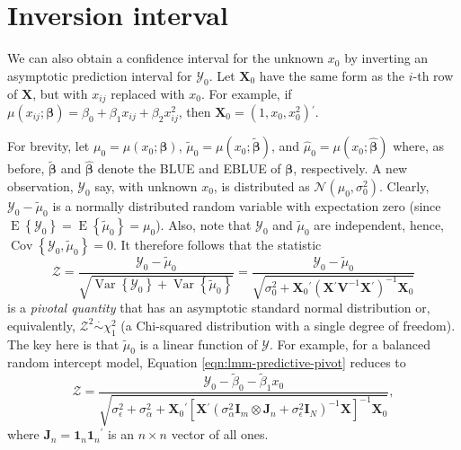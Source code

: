 \documentclass[cmfont,usenames,dvipsnames,leqno]{afit-etd}\usepackage[]{graphicx}\usepackage[]{color}
\newcommand{\trans}{\ensuremath{^\prime}}
\newcommand{\bc}[1]{\ensuremath{\bm{\mathcal{#1}}}}
\newcommand{\mc}[1]{\ensuremath{\mathcal{#1}}}
\newcommand{\wh}[1]{\ensuremath{\widehat{#1}}}
\newcommand{\E}{\operatorname{E}}
\newcommand{\var}{\operatorname{Var}}
\newcommand{\cov}{\operatorname{Cov}}
\newcommand{\X}{\ensuremath{\bm{X}}}
\begin{document}
\section{Inversion interval}
\label{sec:calibration-lmm-inversion}
We can also obtain a confidence interval for the unknown $x_0$ by inverting an asymptotic prediction interval for $\mc{Y}_0$. Let $\X_0$ have the same form as the $i$-th row of $\X$, but with $x_{ij}$ replaced with $x_0$. For example, if $\mu\left(x_{ij}; \bm{\beta}\right) = \beta_0 + \beta_1 x_{ij} + \beta_2 x_{ij}^2$, then $\X_0 = \left(1, x_0, x_0^2\right)\trans$. 

For brevity, let $\mu_0 = \mu\left(x_0; \bm{\beta}\right)$, $\widetilde{\mu}_0 = \mu\left(x_0; \widetilde{\bm{\beta}}\right)$, and $\wh{\mu}_0 = \mu\left(x_0; \wh{\bm{\beta}}\right)$ where, as before, $\widetilde{\bm{\beta}}$ and $\wh{\bm{\beta}}$ denote the BLUE and EBLUE of $\bm{\beta}$, respectively. A new observation, $\mc{Y}_0$ say, with unknown $x_0$, is distributed as $\mc{N}\left(\mu_0, \sigma_0^2\right)$. Clearly, $\mc{Y}_0 - \widetilde{\mu}_0$ is a normally distributed random variable with expectation zero (since $\E\left\{\mc{Y}_0\right\} = \E\left\{\widetilde{\mu}_0\right\} = \mu_0$). Also, note that $\mc{Y}_0$ and $\widetilde{\mu}_0$ are independent, hence, $\cov\left\{\mc{Y}_0, \widetilde{\mu}_0\right\} = 0$. It therefore follows that the statistic 
\begin{equation}
\label{eqn:lmm-predictive-pivot}
  \mc{Z} = \frac{\mc{Y}_0 - \widetilde{\mu}_0}{\sqrt{\var\left\{\mc{Y}_0\right\} + \var\left\{\widetilde{\mu}_0\right\}}} = \frac{\mc{Y}_0 - \widetilde{\mu}_0}{\sqrt{\sigma_0^2 + \X_0\trans\left(\X\trans\bm{V}^{-1}\X\trans\right)^{-1}\X_0}}
\end{equation}
is a \textit{pivotal quantity} that has an asymptotic standard normal distribution or, equivalently, $\mc{Z}^2 \stackrel{\cdot}{\sim} \chi_1^2$ (a Chi-squared distribution with a single degree of freedom). The key here is that $\widetilde{\mu}_0$ is a linear function of $\bc{Y}$. For example, for a balanced random intercept model, Equation \eqref{eqn:lmm-predictive-pivot} reduces to
\begin{equation*}
  \mc{Z} = \frac{\mc{Y}_0 - \widetilde{\beta}_0 - \widetilde{\beta}_1 x_0}{\sqrt{\sigma_\epsilon^2 + \sigma_\alpha^2 + \X_0\trans\left[\X\trans\left( \sigma_\alpha^2\bm{I}_m \otimes \bm{J}_n + \sigma_\epsilon^2\bm{I}_N \right)^{-1}\X\right]^{-1}\X_0}},
\end{equation*}
where $\bm{J}_n = \bm{1}_n\bm{1}_n\trans$ is an $n \times n$ vector of all ones.
\end{document}
